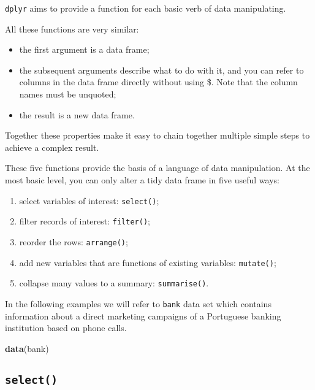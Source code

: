\documentclass[]{book}
\newenvironment{Shaded}{\begin{snugshade}}{\end{snugshade}}
\newcommand{\KeywordTok}[1]{\textcolor[rgb]{0.13,0.29,0.53}{\textbf{{#1}}}}
\newcommand{\NormalTok}[1]{{#1}}
\providecommand{\tightlist}{%
  \setlength{\itemsep}{0pt}\setlength{\parskip}{0pt}}
\def\tightlist{}
\begin{document}
\texttt{dplyr} aims to provide a function for each basic verb of data
manipulating.

All these functions are very similar:

\begin{itemize}
\tightlist
\item
  the first argument is a data frame;
\item
  the subsequent arguments describe what to do with it, and you can
  refer to columns in the data frame directly without using \$. Note
  that the column names must be unquoted;
\item
  the result is a new data frame.
\end{itemize}

Together these properties make it easy to chain together multiple simple
steps to achieve a complex result.

These five functions provide the basis of a language of data
manipulation. At the most basic level, you can only alter a tidy data
frame in five useful ways:

\begin{enumerate}
\def\labelenumi{\arabic{enumi}.}
\tightlist
\item
  select variables of interest: \texttt{select()};
\item
  filter records of interest: \texttt{filter()};
\item
  reorder the rows: \texttt{arrange()};
\item
  add new variables that are functions of existing variables:
  \texttt{mutate()};
\item
  collapse many values to a summary: \texttt{summarise()}.
\end{enumerate}

In the following examples we will refer to \texttt{bank} data set which
contains information about a direct marketing campaigns of a Portuguese
banking institution based on phone calls.

\begin{Shaded}
\begin{Highlighting}[]
\KeywordTok{data}\NormalTok{(bank) }
\end{Highlighting}
\end{Shaded}

\clearpage

\subsection{\texorpdfstring{\texttt{select()}}{select()}}\label{select}
\end{document}
